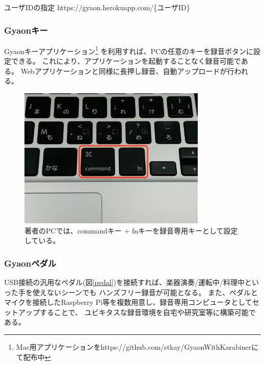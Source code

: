 \begin{itembox}[l]
{ユーザIDの指定}
https://gyaon.herokuapp.com/\{ユーザID\}
\end{itembox}

\subsubsection{Gyaonキー}
Gyaonキーアプリケーション\footnote{\textsf{Mac用アプリケーションをhttps://github.com/stkay/GyaonWithKarabinerにて配布中}}
を利用すれば、PCの任意のキーを録音ボタンに設定できる。
これにより、アプリケーションを起動することなく録音可能である。
Webアプリケーションと同様に長押し録音、自動アップロードが行われる。

\begin{figure}[H]
\centering
\includegraphics[width=9cm]{images/key.png}
\caption{著者のPCでは、commandキー + fnキーを録音専用キーとして設定している。}
\label{key}
\end{figure}

\subsubsection{Gyaonペダル}
USB接続の汎用なペダル(図\ref{pedal})を接続すれば、楽器演奏/運転中/料理中といった手を使えないシーンでも
ハンズフリー録音が可能となる。
また、ペダルとマイクを接続したRaspberry Pi等を複数用意し、録音専用コンピュータとしてセットアップすることで、
ユビキタスな録音環境を自宅や研究室等に構築可能である。


